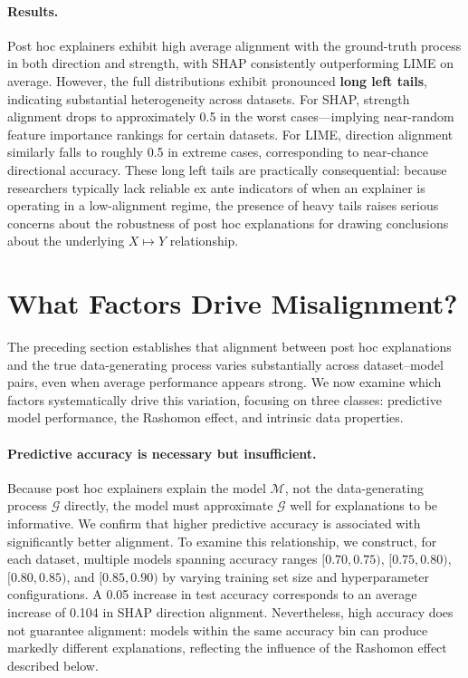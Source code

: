\documentclass[11pt]{article}
\begin{document}
\paragraph{Results.}
Post hoc explainers exhibit high average alignment with the ground-truth process in both direction and strength, with SHAP consistently outperforming LIME on average. However, the full distributions exhibit pronounced \textbf{long left tails}, indicating substantial heterogeneity across datasets. For SHAP, strength alignment drops to approximately 0.5 in the worst cases---implying near-random feature importance rankings for certain datasets. For LIME, direction alignment similarly falls to roughly 0.5 in extreme cases, corresponding to near-chance directional accuracy. These long left tails are practically consequential: because researchers typically lack reliable ex ante indicators of when an explainer is operating in a low-alignment regime, the presence of heavy tails raises serious concerns about the robustness of post hoc explanations for drawing conclusions about the underlying $X \mapsto Y$ relationship.

\section{What Factors Drive Misalignment?}

The preceding section establishes that alignment between post hoc explanations and the true data-generating process varies substantially across dataset--model pairs, even when average performance appears strong. We now examine which factors systematically drive this variation, focusing on three classes: predictive model performance, the Rashomon effect, and intrinsic data properties.

\paragraph{Predictive accuracy is necessary but insufficient.}
Because post hoc explainers explain the model $\mathcal{M}$, not the data-generating process $\mathcal{G}$ directly, the model must approximate $\mathcal{G}$ well for explanations to be informative. We confirm that higher predictive accuracy is associated with significantly better alignment. To examine this relationship, we construct, for each dataset, multiple models spanning accuracy ranges $[0.70, 0.75)$, $[0.75, 0.80)$, $[0.80, 0.85)$, and $[0.85, 0.90)$ by varying training set size and hyperparameter configurations. A 0.05 increase in test accuracy corresponds to an average increase of 0.104 in SHAP direction alignment. Nevertheless, high accuracy does not guarantee alignment: models within the same accuracy bin can produce markedly different explanations, reflecting the influence of the Rashomon effect described below.
\end{document}

